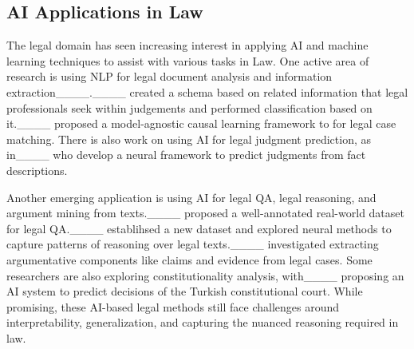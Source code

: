 \subsection{AI Applications in Law}
The legal domain has seen increasing interest in applying AI and machine learning techniques to assist with various tasks in Law. One active area of research is using NLP for legal document analysis and information extraction____.____ created a schema based on related information that legal professionals seek within judgements and performed classification based on it.____ proposed a model-agnostic causal learning framework to for legal case matching. There is also work on using AI for legal judgment prediction, as in____ who develop a neural framework to predict judgments from fact descriptions.

Another emerging application is using AI for legal QA, legal reasoning, and argument mining from texts.____ proposed a well-annotated real-world dataset for legal QA.____ establihsed a new dataset and explored neural methods to capture patterns of reasoning over legal texts.____ investigated extracting argumentative components like claims and evidence from legal cases. Some researchers are also exploring constitutionality analysis, with____ proposing an AI system to predict decisions of the Turkish constitutional court. While promising, these AI-based legal methods still face challenges around interpretability, generalization, and capturing the nuanced reasoning required in law.